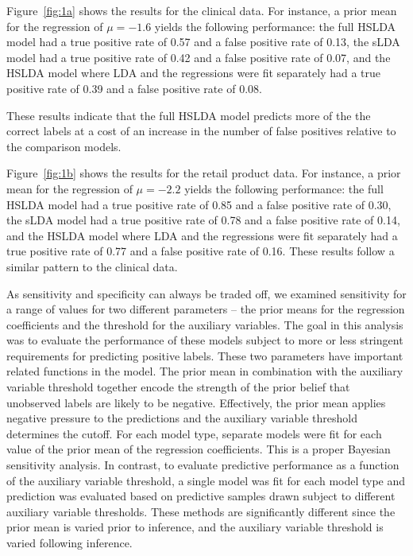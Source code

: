 Figure~\ref{fig:1a} shows the results for the clinical data. For instance, 
a prior mean for the regression of $\mu=-1.6$ yields the following performance:
the full HSLDA model had a 
true positive rate of 0.57 and a false positive rate of 0.13, the sLDA model
had a true positive rate of 0.42 and a false positive rate of 0.07, and the
HSLDA model where LDA and the regressions were fit separately had a true
positive rate of 0.39 and a false positive rate of 0.08.

These results indicate that the full HSLDA model predicts more of the the
correct labels at a cost of an increase in the number of false positives
relative to the comparison models.

Figure~\ref{fig:1b} shows the results for the retail product data. For
instance, a prior mean for the regression of $\mu=-2.2$ yields the following
performance: the full HSLDA model had a true positive rate of 0.85 
and a false positive rate of 0.30, the sLDA model had a true positive
rate of 0.78 and a false positive rate of 0.14, and the HSLDA model where
LDA and the regressions were fit separately had a true positive rate of 0.77
and a false positive rate of 0.16. These results follow a similar pattern to the clinical data.

As sensitivity and specificity can always be traded off, we examined
sensitivity for a range of values for two different parameters -- the prior
means for the regression coefficients and the threshold for the auxiliary
variables.  The goal in this analysis was to evaluate the performance of these
models subject to more or less stringent requirements for predicting positive
labels. These two parameters have important related functions in the model. The
prior mean in combination with the auxiliary variable threshold together encode
the strength of the prior belief that unobserved labels are likely to be
negative. Effectively, the prior mean applies negative pressure to the
predictions and the auxiliary variable threshold determines the cutoff. 
For each model type, separate models were fit for each value of the 
prior mean of the regression coefficients.  This is a proper Bayesian
sensitivity analysis. In contrast, to evaluate
predictive performance as a function of the auxiliary variable threshold,
a single model was fit for each model type and prediction was evaluated
based on predictive samples drawn subject to different auxiliary variable
thresholds. These methods are significantly different since the prior mean
is varied prior to inference, and the auxiliary variable threshold is varied
following inference.

